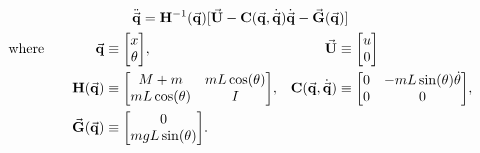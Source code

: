 \documentclass[
    crop,
    margin=0.05in,
    convert={density=150}
]{standalone}
\begin{document}
    $\displaystyle\begin{gathered}
        \ddot{\va{q}} = \vb{H}^{-1}(\va{q})[\va{U} - \vb{C}(\va{q}, \dot{\va{q}})\dot{\va{q}} - \va{G}(\va{q})]\\
        \text{where} \qquad \begin{aligned}[t]
            \va{q} &\equiv \mqty[x \\ \theta] ,& \va{U} &\equiv \mqty[u\\0]\\
            \vb{H}(\va{q}) &\equiv \mqty[M + m & mL\cos(\theta) \\ mL\cos(\theta) & I] ,& \vb{C}(\va{q}, \dot{\va{q}}) &\equiv \mqty[0 & -mL\sin(\theta)\dot{\theta} \\ 0 & 0],\\
            \va{G}(\va{q}) &\equiv \mqty[0 \\ mgL\sin(\theta)].
        \end{aligned}
    \end{gathered}$
\end{document}
